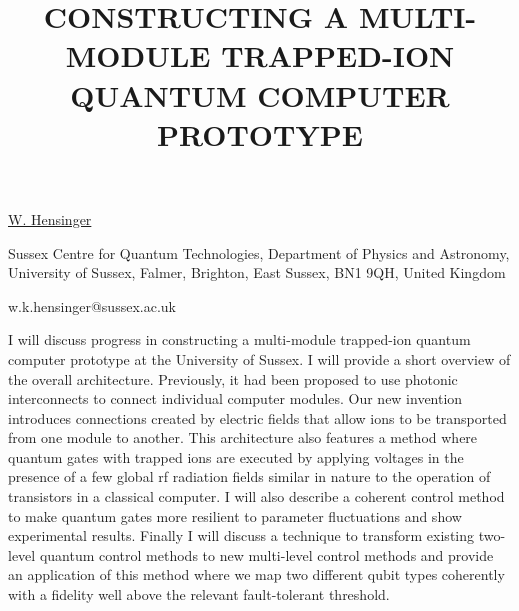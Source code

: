 \title{CONSTRUCTING A MULTI-MODULE TRAPPED-ION QUANTUM COMPUTER PROTOTYPE}

\underline{W. Hensinger} 

{\normalsize{\vspace{-4mm}
Sussex Centre for Quantum Technologies,
Department of Physics and Astronomy,
University of Sussex,
Falmer, Brighton, East Sussex, BN1 9QH,
United Kingdom




\email w.k.hensinger@sussex.ac.uk}}

I will discuss progress in constructing a multi-module trapped-ion quantum computer prototype at the University of Sussex. I will provide a short overview of the overall architecture. Previously, it had been proposed to use photonic interconnects to connect individual computer modules. Our new invention introduces connections created by electric fields that allow ions to be transported from one module to another. This architecture also features a method where quantum gates with trapped ions are executed by applying voltages in the presence of a few global rf radiation fields similar in nature to the operation of transistors in a classical computer. I will also describe a coherent control method to make quantum gates more resilient to parameter fluctuations and show experimental results. Finally I will discuss a technique to transform existing two-level quantum control methods to new multi-level control methods and provide an application of this method where we map two different qubit types coherently with a fidelity well above the relevant fault-tolerant threshold.

\vspace{\baselineskip}
